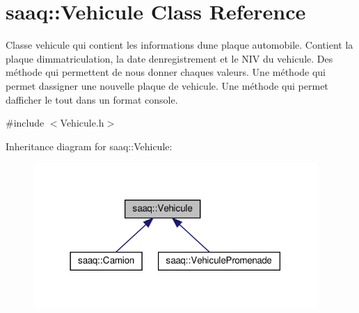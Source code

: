 \hypertarget{classsaaq_1_1Vehicule}{}\section{saaq\+:\+:Vehicule Class Reference}
\label{classsaaq_1_1Vehicule}


Classe vehicule qui contient les informations d\textquotesingle{}une plaque automobile. Contient la plaque d\textquotesingle{}immatriculation, la date d\textquotesingle{}enregistrement et le N\+IV du vehicule. Des méthode qui permettent de nous donner chaques valeurs. Une méthode qui permet d\textquotesingle{}assigner une nouvelle plaque de vehicule. Une méthode qui permet d\textquotesingle{}afficher le tout dans un format console.  




{\ttfamily \#include $<$Vehicule.\+h$>$}



Inheritance diagram for saaq\+:\+:Vehicule\+:\nopagebreak
\begin{figure}[H]
\begin{center}
\leavevmode
\includegraphics[width=306pt]{classsaaq_1_1Vehicule__inherit__graph}
\end{center}
\end{figure}
